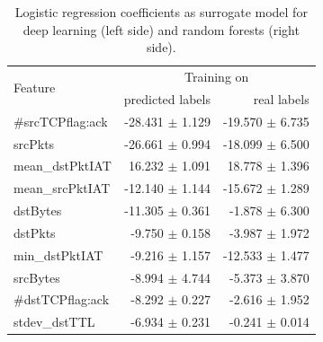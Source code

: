 \documentclass[10pt,sigconf,letterpaper]{acmart}
\begin{document}
 \begin{table}
 \caption{Logistic regression coefficients as surrogate model for deep learning (left side) and random forests (right side).} \label{tab:logreg_coeff}
\begin{tabular}{l r r} \toprule 
\multirow{2}{*}{Feature} & \multicolumn{2}{c}{Training on} \\
  & predicted labels & real labels \\ \midrule
    \#srcTCPflag:ack &  -28.431 $\pm$ 1.129 &  -19.570 $\pm$ 6.735 \\
             srcPkts &  -26.661 $\pm$ 0.994 &  -18.099 $\pm$ 6.500 \\
     mean\_dstPktIAT &   16.232 $\pm$ 1.091 &   18.778 $\pm$ 1.396 \\
     mean\_srcPktIAT &  -12.140 $\pm$ 1.144 &  -15.672 $\pm$ 1.289 \\
            dstBytes &  -11.305 $\pm$ 0.361 &   -1.878 $\pm$ 6.300 \\
             dstPkts &   -9.750 $\pm$ 0.158 &   -3.987 $\pm$ 1.972 \\
      min\_dstPktIAT &   -9.216 $\pm$ 1.157 &  -12.533 $\pm$ 1.477 \\
            srcBytes &   -8.994 $\pm$ 4.744 &   -5.373 $\pm$ 3.870 \\
    \#dstTCPflag:ack &   -8.292 $\pm$ 0.227 &   -2.616 $\pm$ 1.952 \\
       stdev\_dstTTL &   -6.934 $\pm$ 0.231 &   -0.241 $\pm$ 0.014 \\

\end{tabular}
\end{table}
\end{document}
